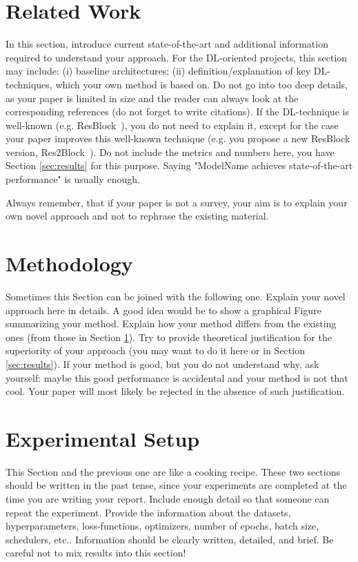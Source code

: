 \documentclass[10pt,conference,compsocconf]{IEEEtran}
\begin{document}
\section{Related Work}\label{sec:related_work}
In this section, introduce current state-of-the-art and additional information required to understand your approach. For the DL-oriented projects, this section may include: (i) baseline architectures; (ii) definition/explanation of key DL-techniques, which your own method is based on. Do not go into too deep details, as your paper is limited in size and the reader can always look at the corresponding references (do not forget to write citations). If the DL-technique is well-known (e.g. ResBlock~\cite{he2016deep}), you do not need to explain it, except for the case your paper improves this well-known technique (e.g. you propose a new ResBlock version, Res2Block~\cite{gao2019res2net}). Do not include the metrics and numbers here, you have Section \ref{sec:results} for this purpose. Saying "ModelName achieves state-of-the-art performance" is usually enough.

Always remember, that if your paper is not a survey, your aim is to explain your own novel approach and not to rephrase the existing material. 

\section{Methodology}\label{sec:methodology}
Sometimes this Section can be joined with the following one. Explain your novel approach here in details. A good idea would be to show a graphical Figure summarizing your method. Explain how your method differs from the existing ones (from those in Section \ref{sec:related_work}). Try to provide theoretical justification for the superiority of your approach (you may want to do it here or in Section \ref{sec:results}). If your method is good, but you do not understand why, ask yourself: maybe this good performance is accidental and your method is not that cool. Your paper will most likely be rejected in the absence of such justification.

\section{Experimental Setup}\label{sec:experimental_setup}
This Section and the previous one are like a cooking recipe. These two sections should be written in the past tense, since your experiments are completed at the time you are writing your report. Include enough detail so that someone can repeat the experiment. Provide the information about the datasets, hyperparameters, loss-functions, optimizers, number of epochs, batch size, schedulers, etc.. Information should be clearly written, detailed, and brief. Be careful not to mix results into this section!
\end{document}
